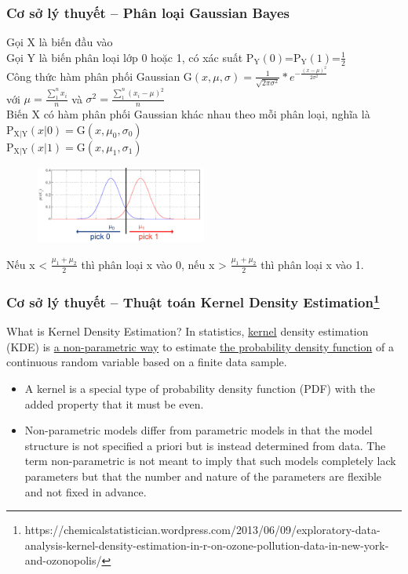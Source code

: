 \documentclass[t]{beamer}
\begin{document}
\begin{frame}[t]
\frametitle{Cơ sở lý thuyết -- Phân loại Gaussian Bayes}
Gọi X là biến đầu vào\\
Gọi Y là biến phân loại lớp 0 hoặc 1, có xác suất $\mathrm{P_Y}(0)$=$\mathrm{P_Y}(1)$=$\frac{1}{2}$\\
Công thức hàm phân phối Gaussian 
$
\mathrm{G}(x,\mu,\sigma)=\frac{1}{\sqrt{2\pi\sigma^2}} * e^{-\frac{(x-\mu)^2}{2\sigma^2}}  
$\\
với $\mu=\frac{\sum_1^n x_i}{n}$ và $\sigma^2=\frac{\sum_1^n (x_i-\mu)^2}{n}$\\
Biến X có hàm phân phối Gaussian khác nhau theo mỗi phân loại, nghĩa là \\
$\mathrm{P_{X|Y}}(x|0)=\mathrm{G}(x,\mu_0,\sigma_0)$\\
$\mathrm{P_{X|Y}}(x|1)=\mathrm{G}(x,\mu_1,\sigma_1)$\\
\begin{figure}[h]
  \centering
    \includegraphics[width=0.5\textwidth]{GaussBayesEx2.png}    
\end{figure}
Nếu x < $\frac{\mu_1+\mu_2}{2}$ thì phân loại x vào 0, nếu x > $\frac{\mu_1+\mu_2}{2}$ thì phân loại x vào 1.
\end{frame}


\begin{frame}[t]
\frametitle{Cơ sở lý thuyết -- Thuật toán Kernel Density Estimation\footnote{https://chemicalstatistician.wordpress.com/2013/06/09/exploratory-data-analysis-kernel-density-estimation-in-r-on-ozone-pollution-data-in-new-york-and-ozonopolis/}}
\begin{block}{What is Kernel Density Estimation?}
In statistics, \underline{kernel} density estimation (KDE) is \underline{a non-parametric way} to estimate \underline{the probability density function} of a continuous random variable based on a finite data sample.
\end{block}
\begin{itemize}
\item A kernel is a special type of probability density function (PDF) with the added property that it must be even. 
\item Non-parametric models differ from parametric models in that the model structure is not specified a priori but is instead determined from data. The term non-parametric is not meant to imply that such models completely lack parameters but that the number and nature of the parameters are flexible and not fixed in advance.
\end{itemize}
\end{frame}
\end{document}
